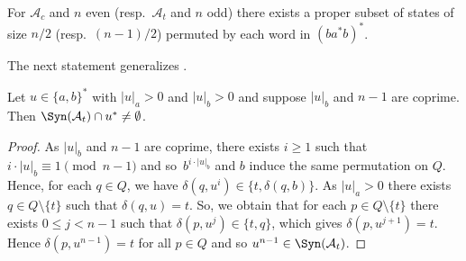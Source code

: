 \begin{corollary} \label{constrsync:subclasses:cor:SI:permutesset-new}
	For $\mathcal A_c$ and $n$ even (resp.~$\mathcal A_t$ and $n$ odd) %
	there exists a proper subset of states of size $n / 2$ (resp.~$(n-1) / 2$) permuted by each word in $(ba^*b)^*$.
\end{corollary}

The next statement generalizes 
.

\begin{proposition} \label{constrsync:subclasses:SI:prop:u-coprime-bs}
	Let $u \in \{a,b\}^*$ with $|u|_a > 0$ and $|u|_b > 0$
	and suppose $|u|_b$ and $n - 1$ are coprime. Then
	$\Syn(\mathcal A_t) \cap u^* \ne \emptyset$.
\end{proposition}
\begin{proof}
	As $|u|_b$ and $n - 1$ are coprime,
	there exists $i \ge 1$ such that $i\cdot |u|_b \equiv 1 \pmod{n - 1}$
	and so~$b^{i \cdot |u|_b}$ and $b$ induce
	the same permutation on $Q$.
	Hence, for each $q \in Q$, we have
	$\delta(q, u^i) \in \{t, \delta(q, b)\}$.
	As $|u|_a > 0$ there exists $q \in Q \setminus \{t \}$
	such that $\delta(q, u) = t$.
	So, we obtain that for each  $p \in Q \setminus \{t\}$ there exists $0 \le j < n - 1$
	such that $\delta(p, u^j) \in  \{t,q \}$,
	which gives $\delta(p, u^{j+1}) = t$.
	Hence $\delta(p, u^{n-1}) = t$ for all $p \in Q$
	and so $u^{n-1} \in \Syn(\mathcal A_t)$.    
\end{proof}

